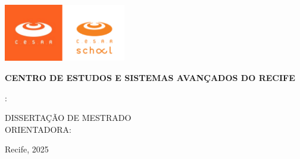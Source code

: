 \begin{titlepage}
    \begin{center}
      \includegraphics[height=2.5cm]{imagens/capa/logos-cesar.png}
      \vspace*{0.7\baselineskip}
    
      {\textbf{\MakeUppercase{Centro de Estudos e Sistemas Avançados do Recife}}} \\
      {\MakeUppercase{\programa}}
    
      {\Large\textbf{\MakeUppercase{\theauthor}}}
    
      \doublespacing
      {\LARGE\textbf{\MakeUppercase{\titulo}}:\break\MakeUppercase{\subtitulo}}
      
      \onehalfspacing
      {\large
        \MakeUppercase{Dissertação de Mestrado} \\
        \MakeUppercase{Orientadora: \orientadora}
      }
    
      \vspace{1cm}
      {\small Recife, 2025}
    \end{center}
\end{titlepage}
